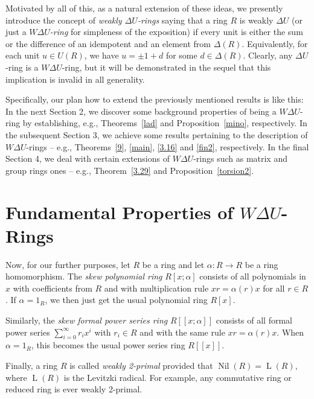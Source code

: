 \documentclass[12pt]{amsart}
\theoremstyle{definition}
\begin{document}
Motivated by all of this, as a natural extension of these ideas, we presently introduce the concept of {\it weakly \(\Delta U\)-rings} saying that a ring \(R\) is weakly \(\Delta U\) (or just a {\it $W\Delta U$-ring} for simpleness of the exposition) if every unit is either the sum or the difference of an idempotent and an element from \(\Delta(R)\). Equivalently, for each unit \(u\in U(R)\), we have \(u = \pm 1 + d\) for some \(d\in \Delta(R)\). Clearly, any \(\Delta U\)-ring is a $W\Delta U$-ring, but it will be demonstrated in the sequel that this implication is invalid in all generality.
	
Specifically, our plan how to extend the previously mentioned results is like this: In the next Section 2, we discover some background properties of being a $W\Delta U$-ring by establishing, e.g., Theorems~\ref{lad} and Proposition~\ref{mino}, respectively. In the subsequent Section 3, we achieve some results pertaining to the description of $W\Delta U$-rings -- e.g., Theorems~\ref{9}, \ref{main}, \ref{3.16} and \ref{fin2}, respectively. In the final Section 4, we deal with certain extensions of $W\Delta U$-rings such as matrix and group rings ones -- e.g., Theorem~\ref{3.29} and Proposition~\ref{torsion2}.
	
\section{Fundamental Properties of $W\Delta U$-Rings}

Now, for our further purposes, let \(R\) be a ring and let \(\alpha: R \to R\) be a ring homomorphism. The {\it skew polynomial ring} \(R[x; \alpha]\) consists of all polynomials in \(x\) with coefficients from \(R\) and with multiplication rule \(x r = \alpha(r) x\) for all \(r\in R\). If \(\alpha = 1_R\), we then just get the usual polynomial ring \(R[x]\).
	
Similarly, the {\it skew formal power series ring} \(R[[x; \alpha]]\) consists of all formal power series \(\sum_{i=0}^{\infty} r_i x^i\) with \(r_i \in R\) and with the same rule \(x r = \alpha(r) x\). When \(\alpha = 1_R\), this becomes the usual power series ring \(R[[x]]\).
	
Finally, a ring \(R\) is called {\it weakly 2-primal} provided that \(\operatorname{Nil}(R) = \operatorname{L}(R)\), where \(\operatorname{L}(R)\) is the Levitzki radical. For example, any commutative ring or reduced ring is ever weakly 2-primal.

\medskip
\end{document}
